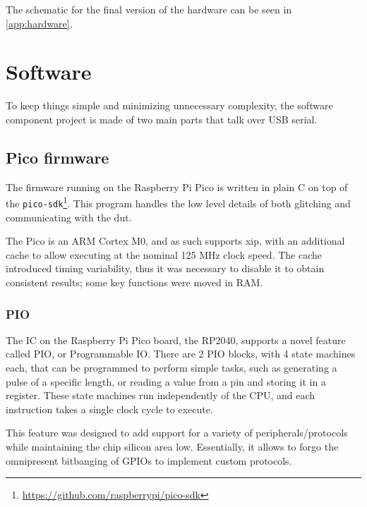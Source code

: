 \documentclass[a4paper,english,twoside,10pt]{article}
\begin{document}
The schematic for the final version of the hardware can be seen in \autoref{app:hardware}.



\section{Software}\label{sect:software}
To keep things simple and minimizing unnecessary complexity, the software component project is made of two main parts that talk over USB serial.

\subsection{Pico firmware}
The firmware running on the Raspberry Pi Pico is written in plain C on top of the \texttt{pico-sdk}\footnote{\url{https://github.com/raspberrypi/pico-sdk}}. This program handles the low level details of both glitching and communicating with the \gls{dut}.

The Pico is an ARM Cortex M0, and as such supports \gls{xip}, with an additional cache to allow executing at the nominal 125 MHz clock speed. The cache introduced timing variability, thus it was necessary to disable it to obtain consistent results; some key functions were moved in RAM.

\subsubsection{PIO}
The IC on the Raspberry Pi Pico board, the RP2040, supports a novel feature called PIO, or Programmable IO. There are 2 PIO blocks, with 4 state machines each, that can be programmed to perform simple tasks, such as generating a pulse of a specific length, or reading a value from a pin and storing it in a register. These state machines run independently of the CPU, and each instruction takes a single clock cycle to execute.

This feature was designed to add support for a variety of peripherals/protocols while maintaining the chip silicon area low. Essentially, it allows to forgo the omnipresent bitbanging of GPIOs to implement custom protocols.
\end{document}
